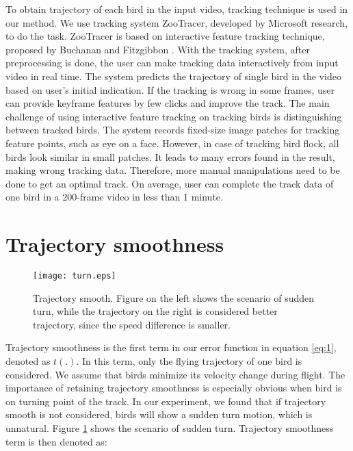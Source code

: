 To obtain trajectory of each bird in the input video, tracking technique is used in our method. We use tracking system ZooTracer\cite{ZooTracer}, developed by Microsoft research, to do the task. ZooTracer is based on interactive feature tracking technique, proposed by Buchanan and Fitzgibbon \cite{Tracking}. With the tracking system, after preprocessing is done, the user can make tracking data interactively from input video in real time. The system predicts the trajectory of single bird in the video based on user's initial indication. If the tracking is wrong in some frames, user can provide keyframe features by few clicks and improve the track.
The main challenge of using interactive feature tracking on tracking birds is distinguishing between tracked birds. The system records fixed-size image patches for tracking feature points, such as eye on a face. However, in case of tracking bird flock, all birds look similar in small patches. It leads to many errors found in the result, making wrong tracking data. Therefore, more manual manipulations need to be done to get an optimal track. On average, user can complete the track data of one bird in a 200-frame video in less than 1 minute.



\section{Trajectory smoothness}


\begin{figure}[h]
 \begin{center}
  \texttt{[image: turn.eps]}
 \end{center}
 \caption{Trajectory smooth. Figure on the left shows the scenario of sudden turn, while the trajectory on the right is considered better trajectory, since the speed difference is smaller.}
 \label{figure:turn}
\end{figure}



Trajectory smoothness is the first term in our error function in equation \ref{eq:1}, denoted as $t(.)$. In this term, only the flying trajectory of one bird is considered. We assume that birds minimize its velocity change during flight. The importance of retaining trajectory smoothness is especially obvious when bird is on turning point of the track. In our experiment, we found that if trajectory smooth is not considered, birds will show a sudden turn motion, which is unnatural. Figure \ref{figure:turn} shows the scenario of sudden turn. Trajectory smoothness term is then denoted as:

